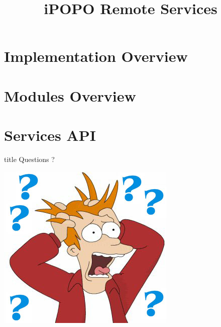 \documentclass{beamer}
\title[Remote Services]{iPOPO Remote Services}
\begin{document}
\frame{\titlepage}

\section{Implementation Overview}


\section{Modules Overview}


\section{Services API}


\begin{frame}
  \vfill
  \centering
  \begin{beamercolorbox}[sep=8pt,center,shadow=true,rounded=true]{title}
    Questions ?\par%
  \end{beamercolorbox}
  \vspace{3ex}
  \includegraphics[width=.5\textwidth]{../imgs/questions_fry_3}
  \vfill
\end{frame}
\end{document}
